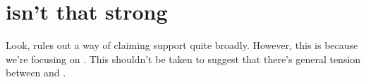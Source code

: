 \section{\nI{} isn't that strong}
\label{sec:ni-isnt-that}

\begin{note}
  Look, \nI{} rules out a way of claiming support quite broadly.
  However, this is because we're focusing on .
  This shouldn't be taken to suggest that there's general tension between \nI{} and \adA{}.
\end{note}

